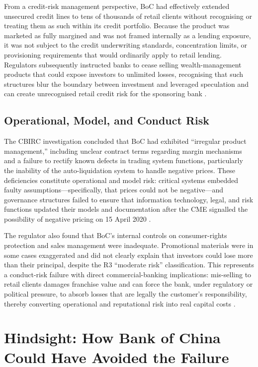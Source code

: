 \documentclass[a4paper,11pt]{article}
\begin{document}
From a credit-risk management perspective, BoC had effectively
extended unsecured credit lines to tens of thousands of retail
clients without recognising or treating them as such within its
credit portfolio. Because the product was marketed as fully margined
and was not framed internally as a lending exposure, it was not
subject to the credit underwriting standards, concentration limits,
or provisioning requirements that would ordinarily apply to retail
lending. Regulators subsequently instructed banks to cease selling
wealth-management products that could expose investors to unlimited
losses, recognising that such structures blur the boundary between
investment and leveraged speculation and can create unrecognised
retail credit risk for the sponsoring bank \cite{reuters2020fined}.

\subsection{Operational, Model, and Conduct Risk}

The CBIRC investigation concluded that BoC had exhibited ``irregular
product management,'' including unclear contract terms regarding
margin mechanisms and a failure to rectify known defects in trading
system functions, particularly the inability of the auto-liquidation
system to handle negative prices. These deficiencies constitute
operational and model risk: critical systems embedded faulty
assumptions---specifically, that prices could not be negative---and
governance structures failed to ensure that information technology,
legal, and risk functions updated their models and documentation
after the CME signalled the possibility of negative pricing on 15
April 2020 \cite{cgtn2020fined}.

The regulator also found that BoC's internal controls on
consumer-rights protection and sales management were inadequate.
Promotional materials were in some cases exaggerated and did not
clearly explain that investors could lose more than their principal,
despite the R3 ``moderate risk'' classification. This represents a
conduct-risk failure with direct commercial-banking implications:
mis-selling to retail clients damages franchise value and can force
the bank, under regulatory or political pressure, to absorb losses
that are legally the customer's responsibility, thereby converting
operational and reputational risk into real capital costs
\cite{caixin2020probe}.

\section{Hindsight: How Bank of China Could Have Avoided the Failure}
\end{document}
